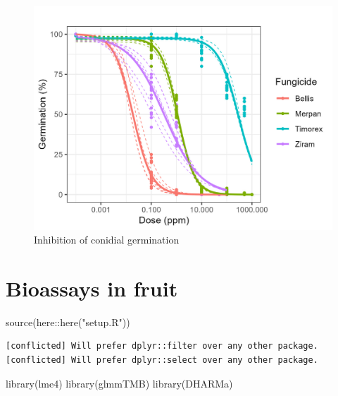 \documentclass[
  letterpaper,
  DIV=11,
  numbers=noendperiod]{scrreport}
\newenvironment{Shaded}{\begin{snugshade}}{\end{snugshade}}
\newcommand{\FunctionTok}[1]{\textcolor[rgb]{0.28,0.35,0.67}{#1}}
\newcommand{\NormalTok}[1]{\textcolor[rgb]{0.00,0.23,0.31}{#1}}
\newcommand{\SpecialCharTok}[1]{\textcolor[rgb]{0.37,0.37,0.37}{#1}}
\newcommand{\StringTok}[1]{\textcolor[rgb]{0.13,0.47,0.30}{#1}}
\begin{document}
\begin{figure}

{\centering \includegraphics{plots/germi_curves.jpg}

}

\caption{Inhibition of conidial germination}

\end{figure}


\hypertarget{bioassays-in-fruit}{%
\chapter{Bioassays in fruit}\label{bioassays-in-fruit}}

\begin{Shaded}
\begin{Highlighting}[]
\FunctionTok{source}\NormalTok{(here}\SpecialCharTok{::}\FunctionTok{here}\NormalTok{(}\StringTok{"setup.R"}\NormalTok{))}
\end{Highlighting}
\end{Shaded}

\begin{verbatim}
[conflicted] Will prefer dplyr::filter over any other package.
[conflicted] Will prefer dplyr::select over any other package.
\end{verbatim}

\begin{Shaded}
\begin{Highlighting}[]
\FunctionTok{library}\NormalTok{(lme4)}
\FunctionTok{library}\NormalTok{(glmmTMB)}
\FunctionTok{library}\NormalTok{(DHARMa)}
\end{Highlighting}
\end{Shaded}
\end{document}

